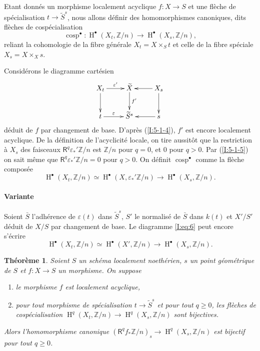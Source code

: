 \documentclass{book}
\DeclareMathOperator{\cosp}{cosp}
\DeclareMathOperator{\h}{H}
\newcommand{\dZ}{\mathbb{Z}}
\newcommand{\R}{\mathsf{R}}
\newtheorem{theorem}[subsubsection]{Théorème}
\begin{document}
\subsubsection{}\label{I:5-1-6}

Etant donnés un morphisme localement acyclique $f:X\to S$ et une flèche de 
spécialisation $t\to \widetilde S^s$, nous allons définir des 
homomorphismes canoniques, dits flèches de cospécialisation 
\[
  \cosp^\bullet : \h^\bullet(X_t,\dZ/n) \to \h^\bullet(X_s,\dZ/n)\text{,}
\]
reliant la cohomologie de la fibre générale $X_t=X\times_S t$ et celle de la 
fibre spéciale $X_s=X\times_X s$. 

Considérons le diagramme cartésien 
\[\xymatrix{
  X_t \ar[d] \ar[r]^-{\varepsilon'} 
    & \widetilde X \ar[d]^-{f'} 
    & \ar[l] X_s \ar[d] \\
  t \ar[r]^-\varepsilon 
    & \widetilde S^s 
    & \ar[l] s
}\]
déduit de $f$ par changement de base. D'après (\ref{I:5-1-4}), $f'$ est encore 
localement acyclique. De la définition de l'acyclicité locale, on tire 
aussitôt que la restriction à $X_s$ des faisceaux $\R^q \varepsilon_*' \dZ/n$ 
est $\dZ/n$ pour $q=0$, et $0$ pour $q>0$. Par (\ref{I:5-1-5}) on sait même que 
$\R^q \varepsilon_*'\dZ/n = 0$ pour $q>0$. On définit $\cosp^\bullet$ comme la 
flèche composée 
\begin{equation}\label{I:eq:6}
  \h^\bullet(X_t,\dZ/n) \simeq \h^\bullet(X,\varepsilon_*' \dZ/n) \to \h^\bullet(X_s,\dZ/n) \text{.}
\end{equation}

\paragraph{Variante}
Soient $\bar S$ l'adhérence de $\varepsilon(t)$ dans $\widetilde S^s$, $S'$ le 
normalisé de $\bar S$ dans $k(t)$ et $X'/S'$ déduit de $X/S$ par changement 
de base. Le diagramme \eqref{I:eq:6} peut encore s'écrire 
\[
  \h^\bullet(X_t,\dZ/n) \simeq \h^\bullet(X',\dZ/n) \to \h^\bullet(X_s,\dZ/n) \text{.}
\]





\begin{theorem}\label{I:5-1-7}
Soient $S$ un schéma localement noethérien, $s$ un point géométrique de 
$S$ et $f:X\to S$ un morphisme. On suppose 
\begin{enumerate}[\indent a)]
  \item le morphisme $f$ est localement acyclique, 
  \item pour tout morphisme de spécialisation $t\to \widetilde S^s$ et pour 
    tout $q\geqslant 0$, les flèches de cospécialisation 
    $\h^q(X_t,\dZ/n) \to \h^q(X_s,\dZ/n)$ sont bijectives.
\end{enumerate}

Alors l'homomorphisme canonique $(\R^q f_*\dZ/n)_s\to \h^q(X_s,\dZ/n)$ est 
bijectif pour tout $q\geqslant 0$. 
\end{theorem}
\end{document}
